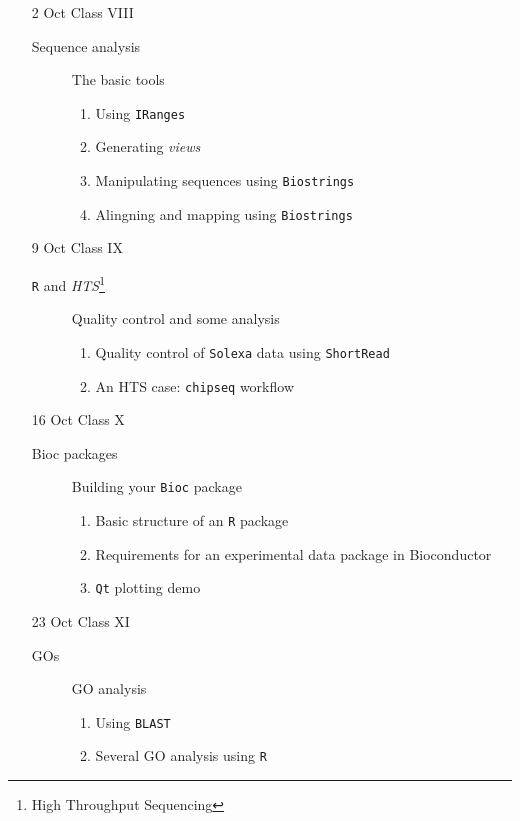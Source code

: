 \documentclass[letterpaper,12pt]{article}
\newcommand{\pl}[1]{\texttt{#1}}
\begin{document}
\begin{itemize}
  \item[2 Oct] Class VIII
  \begin{description}
  \item[Sequence analysis] The basic tools
  \begin{enumerate}
  \item Using \pl{IRanges}
  \item Generating \emph{views}
  \item Manipulating sequences using \pl{Biostrings}
  \item Alingning and mapping using \pl{Biostrings}
  \end{enumerate}
  \end{description}
  
  \item[9 Oct] Class IX
  \begin{description}
  \item[\pl{R} and \emph{HTS}\footnote{High Throughput Sequencing}] Quality control and some analysis
    \begin{enumerate}
      \item Quality control of \pl{Solexa} data using \pl{ShortRead}
      \item An HTS case: \pl{chipseq} workflow
    \end{enumerate}
  \end{description}
  
  \item[16 Oct] Class X
  \begin{description}
  \item[Bioc packages] Building your \pl{Bioc} package
  \begin{enumerate}
  \item Basic structure of an \pl{R} package
  \item Requirements for an experimental data package in Bioconductor
  \item \pl{Qt} plotting demo
  \end{enumerate}
  \end{description}
  
  \item[23 Oct] Class XI
  \begin{description}
  \item[GOs] GO analysis
  \begin{enumerate}
  \item Using \pl{BLAST}
  \item Several GO analysis using \pl{R}
  \end{enumerate}
  \end{description}  
  

\end{itemize}
\end{document}
